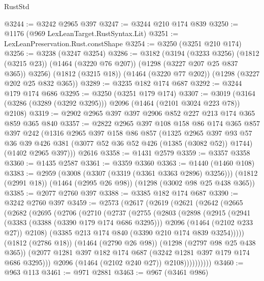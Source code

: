 \begin{lexlean}{RustStd}
\begin{coremodule}
@3244 := @3242 @2965 @397
@3247 := @3244 @210 @174 @839
@3250 := @1176 (@969 LexLeanTarget.RustSyntax.Lit)
@3251 := LexLeanPreservation.Rust.constShape
@3254 := @3250 (@3251 @210 @174)
@3256 := @3238 (@3247 @3254)
@3286 := @3182
    (@3194
      (@3233 @3256)
      (@1812 (@3215 @23))
      (@1464 (@3220 @76 @207))
      (@1298 (@3227 @207 @25 @837 @365))
      @3256)
    (@1812 (@3215 @18))
    (@1464 (@3220 @77 @202))
    (@1298 (@3227 @202 @25 @832 @365))
@3289 := @3235 @182 @174 @687
@3292 := @3244 @179 @174 @686
@3295 := @3250 (@3251 @179 @174)
@3307 := @3019 (@3164 (@3286 (@3289 (@3292 @3295))) @2096 (@1464 (@2101 @3024 @223 @78)) @2108)
@3319 := @2902 @2965 @397 @397 @2906 @852 @227 @213 @174 @365 @859 @365 @840
@3357 := @2822
    @2965
    @397
    @108
    @158
    @86
    @174
    @365
    @857
    @397
    @242
    (@1316
      @2965
      @397
      @158
      @86
      @857
      (@1325
        @2965
        @397
        @93
        @57
        @36
        @39
        @426
        @381
        (@3077 @52 @36 @52 @426 (@1385 (@3082 @52)) @1744)
        (@1402 @2965 @397)))
    @2616
@3358 := @1431 @2579
@3359 := @3357 @3358
@3360 := @1435 @2587
@3361 := @3359 @3360
@3363 := @1440 (@1460 @108)
@3383 := @2959
    (@3008 (@3307 (@3319 (@3361 @3363 @2896) @3256)))
    (@1812 (@2991 @18))
    (@1464 (@2995 @26 @98))
    (@1298 (@3002 @98 @25 @438 @365))
@3385 := @2077 @2760 @397
@3388 := @3385 @182 @174 @687
@3390 := @3242 @2760 @397
@3459 := @2573
    (@2617
      (@2619
        (@2621
          (@2642
            (@2665
              (@2682
                (@2695
                  (@2706
                    (@2710
                      (@2737
                        (@2755
                          (@2803
                            (@2898
                              (@2915
                                (@2941
                                  (@3383 (@3388 (@3390 @179 @174 @686 @3295)))
                                  @2096
                                  (@1464 (@2102 @233 @27))
                                  @2108)
                                (@3385 @213 @174 @840 (@3390 @210 @174 @839 @3254)))))
                          (@1812 (@2786 @18))
                          (@1464 (@2790 @26 @98))
                          (@1298 (@2797 @98 @25 @438 @365))
                          (@2077 @1281 @397 @182 @174 @687 (@3242 @1281 @397 @179 @174 @686 @3295)))
                        @2096
                        (@1464 (@2102 @240 @27))
                        @2108))))))))))
@3460 := @963 @113
@3461 := @971 @2881
@3463 := @967 (@3461 @986)

\end{coremodule}
\end{lexlean}
